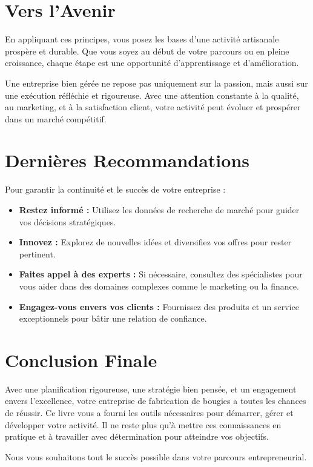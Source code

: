 \documentclass[11pt,fleqn,onecolumn,oneside]{book}
\begin{document}
\section*{Vers l’Avenir}

En appliquant ces principes, vous posez les bases d’une activité artisanale prospère et durable. Que vous soyez au début de votre parcours ou en pleine croissance, chaque étape est une opportunité d’apprentissage et d’amélioration.

\begin{corollary}
Une entreprise bien gérée ne repose pas uniquement sur la passion, mais aussi sur une exécution réfléchie et rigoureuse. Avec une attention constante à la qualité, au marketing, et à la satisfaction client, votre activité peut évoluer et prospérer dans un marché compétitif.
\end{corollary}

\section*{Dernières Recommandations}

Pour garantir la continuité et le succès de votre entreprise :
\begin{itemize}
    \item \textbf{Restez informé :} Utilisez les données de recherche de marché pour guider vos décisions stratégiques.
    \item \textbf{Innovez :} Explorez de nouvelles idées et diversifiez vos offres pour rester pertinent.
    \item \textbf{Faites appel à des experts :} Si nécessaire, consultez des spécialistes pour vous aider dans des domaines complexes comme le marketing ou la finance.
    \item \textbf{Engagez-vous envers vos clients :} Fournissez des produits et un service exceptionnels pour bâtir une relation de confiance.
\end{itemize}

\section*{Conclusion Finale}

Avec une planification rigoureuse, une stratégie bien pensée, et un engagement envers l’excellence, votre entreprise de fabrication de bougies a toutes les chances de réussir. Ce livre vous a fourni les outils nécessaires pour démarrer, gérer et développer votre activité. Il ne reste plus qu’à mettre ces connaissances en pratique et à travailler avec détermination pour atteindre vos objectifs.

Nous vous souhaitons tout le succès possible dans votre parcours entrepreneurial.
\end{document}
